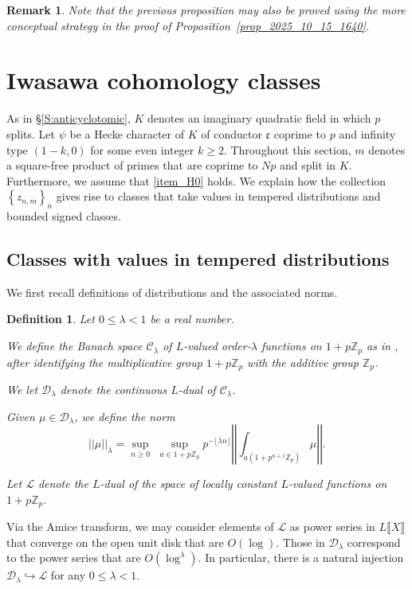 \documentclass{amsart}
\numberwithin{equation}{section}
\newtheorem{defn}[theorem]{Definition}
\newtheorem{remark}[theorem]{Remark}
\newcommand{\frk}{\mathfrak}
\newcommand{\Zp}{\mathbb{Z}_p}
\newcommand{\cC}{\mathcal{C}}
\newcommand{\cD}{\mathcal{D}}
\newcommand{\sL}{\mathscr{L}}
\begin{document}
\begin{remark}
    Note that the previous proposition may also be proved using the more conceptual strategy in the proof of Proposition~\ref{prop_2025_10_15_1640}.
\end{remark}








\section{Iwasawa cohomology classes}
As in \S\ref{S:anticyclotomic}, $K$ denotes an imaginary quadratic field in which $p$ splits.  Let $\psi$ be a Hecke character of $K$ of conductor $\frk{c}$ coprime to $p$ and infinity type $(1-k,0)$ for some even integer $k\geq 2$. Throughout this section, $m$ denotes a square-free product of primes that are coprime to $Np$ and split in $K$. Furthermore, we assume that \eqref{item_H0}  holds. We explain how the collection $\left\{z_{n,m}\right\}_{n}$ gives rise to classes that take values in tempered distributions and bounded signed classes. 


\subsection{Classes with values in tempered distributions}
We first recall definitions of distributions and the associated norms. 
\begin{defn}
\label{defn_PR_rings}
Let $0\le \lambda<1$ be a real number.
\item[i)]  We define the Banach space $\cC_\lambda$ of $L$-valued order-$\lambda$ functions on $1+p\Zp$ as in \cite[\S I.5]{Colmez2010Ast}, after identifying the multiplicative group $1+p\Zp$ with the additive group $\Zp$.
   
\item[ii)] We let $\cD_\lambda$ denote the continuous $L$-dual of $\cC_\lambda$.
   \item[iii)] Given $\mu\in\cD_\lambda$, we define the norm
   \[
   ||\mu||_\lambda=\sup_{n\ge 0}\,\,\sup_{a\in 1+p\Zp} p^{-\lfloor \lambda n\rfloor}\left|\left|\int_{a(1+p^{n+1}\Zp)} \mu\right|\right|.
   \]
   \item[iv)] Let $\sL$ denote the $L$-dual of the space of locally constant $L$-valued functions on $1+p\Zp$.
\end{defn}

 Via the Amice transform, we may consider elements of $\sL$ as power series in $L\llbracket X\rrbracket$ that converge on the open unit disk that are $O(\log)$. Those in $\cD_\lambda$ correspond to the power series that are $O(\log^\lambda)$. In particular, there is a natural injection $\cD_{\lambda}\hookrightarrow\sL$ for any $0\le \lambda<1$.
 
\end{document}
